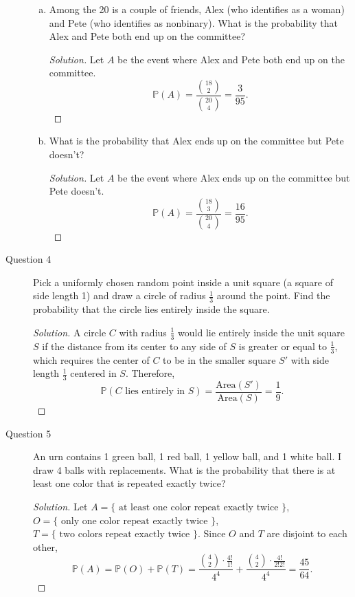 \documentclass[addpoints, 11pt]{exam}
\newcommand*{\prob}{\mathds{P}}
\begin{document}
\begin{description}
\begin{enumerate}[(a)]
        \item Among the 20 is a couple of friends, Alex (who identifies as a woman) and Pete (who identifies as nonbinary). What is the probability that Alex and Pete both end up on the committee?
        \begin{proof}[Solution]
            Let $A$ be the event where Alex and Pete both end up on the committee.
            \[
                \prob(A) = \frac{{18 \choose 2}}{{20 \choose 4}} = \frac{3}{95}.
            \]
        \end{proof}

        \item What is the probability that Alex ends up on the committee but Pete doesn’t?
        \begin{proof}[Solution]
            Let $A$ be the event where Alex ends up on the committee but Pete doesn’t.
            \[
                \prob(A) = \frac{{18 \choose 3}}{{20 \choose 4}} = \frac{16}{95}.
            \]
        \end{proof}
    \end{enumerate}

    \newpage

    \item[Question 4]  Pick a uniformly chosen random point inside a unit square (a square of side length 1) and draw a circle of radius $\frac{1}{3}$ around the point. Find the probability that the circle lies entirely inside the square.
    \begin{proof}[Solution]
        A circle $C$ with radius $\frac{1}{3}$ would lie entirely inside the unit square $S$ if the distance from its center to any side of $S$ is greater or equal to $\frac{1}{3}$, which requires the center of $C$ to be in the smaller square $S'$ with side length $\frac{1}{3}$ centered in $S$. Therefore, 
        \[
            \prob(C \text{ lies entirely in } S) = \frac{\text{Area}(S')}{\text{Area}(S)} = \frac{1}{9}.
        \]
    \end{proof}

    \newpage

    \item[Question 5]  An urn contains 1 green ball, 1 red ball, 1 yellow ball, and 1 white ball. I draw 4 balls with replacements. What is the probability that there is at least one color that is repeated exactly twice?

    \begin{proof}[Solution]
        Let $A = \{\text{ at least one color repeat exactly twice }\}$, $O = \{\text{ only one color repeat exactly twice }\}$, $T = \{\text{ two colors repeat exactly twice }\}$. Since $O$ and $T$ are disjoint to each other, 
        \[
            \prob(A) = \prob(O) + \prob(T) = \frac{{ 4 \choose 2 } \cdot \frac{4!}{1!}}{4^4} + \frac{{ 4 \choose 2 } \cdot \frac{4!}{2!2!}}{4^4} = \frac{45}{64}.
        \]
        

\end{proof}
\end{description}
\end{document}
